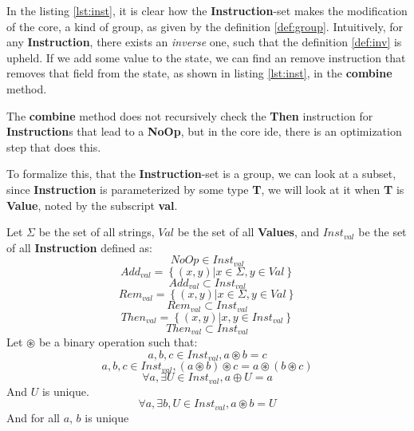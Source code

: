 In the listing \ref{lst:inst}, it is clear how the \textbf{Instruction}-set makes the
modification of the core, a kind of group, as given by the definition
\ref{def:group}. Intuitively, for any \textbf{Instruction}, there exists
an \textit{inverse} one, such that the definition \ref{def:inv} is upheld. If we
add some value to the state, we can find an remove instruction that removes
that field from the state, as shown in listing \ref{lst:inst}, in the
\textbf{combine} method.

\begin{remark}
  The \textbf{combine} method does not recursively check the \textbf{Then}
  instruction for \textbf{Instruction}s that lead to a \textbf{NoOp}, but in the
  core \gls{ide}, there is an optimization step that does this.
\end{remark}

To formalize this, that the \textbf{Instruction}-set is a group, we can look at
a subset, since \textbf{Instruction} is parameterized by some type \textbf{T},
we will look at it when \textbf{T} is \textbf{Value}, noted by the subscript
\textbf{val}.

\begin{lemma} \label{lem:intr}
  Let $\Sigma$ be the set of all strings, $Val$ be the set of all
  \textbf{Values}, and
  $Inst_{val}$ be the set of all \textbf{Instruction} defined as:
  $$
    NoOp \in Inst_{val}
  $$
  $$
    Add_{val} = \left \{ (x, y) \vert x \in \Sigma, y \in Val \right \}
  $$
  $$
    Add_{val} \subset Inst_{val}
  $$
  $$
    Rem_{val} = \left \{ (x, y) \vert x \in \Sigma, y \in Val \right \}
  $$
  $$
    Rem_{val} \subset Inst_{val}
  $$
  $$
    Then_{val} = \left \{ (x, y) \vert x, y \in Inst_{val} \right \}
  $$
  $$
    Then_{val} \subset Inst_{val}
  $$
  Let $\circledast$ be a binary operation such that:
  $$
  a, b, c \in Inst_{val}, a \circledast b = c
  $$
  $$
  a, b, c \in Inst_{val}, \left ( a \circledast b \right ) \circledast c = a \circledast \left ( b \circledast c \right )
  $$
  $$
  \forall a, \exists U \in Inst_{val}, a \oplus U = a
  $$
  And $U$ is unique.
  $$
  \forall a, \exists b, U \in Inst_{val}, a \circledast b = U
  $$
  And for all $a$, $b$ is unique
\end{lemma}

